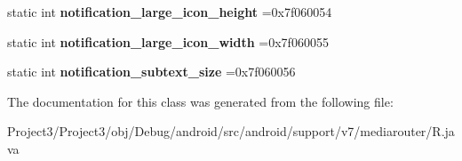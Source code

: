 \begin{DoxyCompactItemize}
\item 
\mbox{\label{classandroid_1_1support_1_1v7_1_1mediarouter_1_1R_1_1dimen_a6de2bbc38cf16f7c357898bdc1ebc720}} 
static int {\bfseries notification\+\_\+large\+\_\+icon\+\_\+height} =0x7f060054
\item 
\mbox{\label{classandroid_1_1support_1_1v7_1_1mediarouter_1_1R_1_1dimen_a5e21d559504f3754b13603a2aab23805}} 
static int {\bfseries notification\+\_\+large\+\_\+icon\+\_\+width} =0x7f060055
\item 
\mbox{\label{classandroid_1_1support_1_1v7_1_1mediarouter_1_1R_1_1dimen_a1b4ba59ef63d5bf587aa76b168d83872}} 
static int {\bfseries notification\+\_\+subtext\+\_\+size} =0x7f060056
\end{DoxyCompactItemize}


The documentation for this class was generated from the following file\+:\begin{DoxyCompactItemize}
\item 
Project3/\+Project3/obj/\+Debug/android/src/android/support/v7/mediarouter/R.\+java\end{DoxyCompactItemize}
